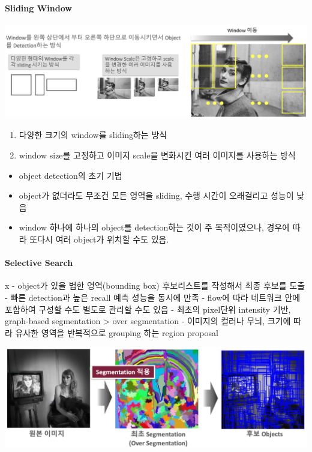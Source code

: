 \documentclass[
]{article}
\providecommand{\tightlist}{%
  \setlength{\itemsep}{0pt}\setlength{\parskip}{0pt}}
\begin{document}
\hypertarget{sliding-window}{%
\paragraph{Sliding Window}\label{sliding-window}}

\includegraphics{figs/Chapter1-2.png}

\begin{enumerate}
\def\labelenumi{\arabic{enumi}.}
\tightlist
\item
  다양한 크기의 window를 sliding하는 방식
\item
  window size를 고정하고 이미지 scale을 변화시킨 여러 이미지를 사용하는
  방식
\end{enumerate}

\begin{itemize}
\tightlist
\item
  object detection의 초기 기법
\item
  object가 없더라도 무조건 모든 영역을 sliding, 수행 시간이 오래걸리고
  성능이 낮음
\item
  window 하나에 하나의 object를 detection하는 것이 주 목적이였으나,
  경우에 따라 또다시 여러 object가 위치할 수도 있음.
\end{itemize}

\hypertarget{selective-search}{%
\paragraph{Selective Search}\label{selective-search}}

x - object가 있을 법한 영역(bounding box) 후보리스트를 작성해서 최종
후보를 도출 - 빠른 detection과 높은 recall 예측 성능을 동시에 만족 -
flow에 따라 네트워크 안에 포함하여 구성할 수도 별도로 관리할 수도 있음 -
최초의 pixel단위 intensity 기반, graph-based segmentation \textgreater{}
over segmentation - 이미지의 컬러나 무늬, 크기에 따라 유사한 영역을
반복적으로 grouping 하는 region proposal

\includegraphics{figs/Chapter1-3.png}
\end{document}
